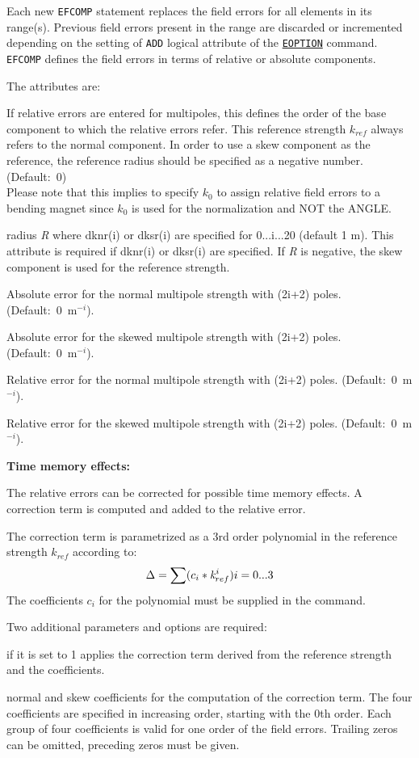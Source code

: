 Each new {\tt EFCOMP} statement replaces the field errors for all
elements in its range(s). Previous field errors present in the range are
discarded or incremented depending on the setting of
{\tt ADD} logical attribute of the \hyperref[sec:eoption]{\tt EOPTION} command. 
{\tt EFCOMP} defines the field errors in terms of
relative or absolute components.

The attributes are: 
\begin{madlist}
   If relative errors are entered for multipoles, this defines
  the order of the base component to which the relative  errors
  refer. This reference strength $k_{ref}$ always refers to the
  normal component. In order to use a skew component as the reference, the
  reference radius should be specified as a negative number. (Default:~0)  \\
  Please note that this implies to specify $k_0$ to assign
  relative field errors to a bending magnet since $k_0$ is used
  for the normalization and NOT the ANGLE. 

   radius {\it R} where dknr(i) or dksr(i) are specified
  for 0...i...20 (default 1 m). This attribute is required if dknr(i) or
  dksr(i) are specified. If {\it R} is negative, the skew component is
  used for the reference strength.  

   Absolute error for the normal multipole strength with
  (2i+2) poles. (Default:~0~m$^{-i}$).  

   Absolute error for the skewed multipole strength with
  (2i+2) poles. (Default:~0~m$^{-i}$).  

   Relative error for the normal multipole strength with
  (2i+2) poles. (Default:~0~m$^{-i}$).  

   Relative error for the skewed multipole strength with
  (2i+2) poles. (Default:~0~m$^{-i}$).  
\end{madlist}


{\bf Time memory effects:}

The relative errors can be corrected for possible time memory effects. A
correction term is computed and added to the relative error. 

The correction term is parametrized as a 3rd order polynomial in the
reference strength $k_{ref}$ according to:  
\[ \Delta = \sum (c_i * {\it k}^{i}_{ref})            i = 0...3\]
The coefficients $c_i$ for the polynomial must be supplied in the
command.  

Two additional parameters and options are required: 
\begin{madlist}
   if it is set to 1 applies the correction term derived from the
  reference strength and the coefficients.  

   normal and skew coefficients for the computation
  of the correction term. The four coefficients are specified in increasing
  order, starting with the 0th order. Each group of four coefficients is
  valid for one order of the field errors. Trailing zeros can be omitted,
  preceding zeros must be given.  
\end{madlist}


